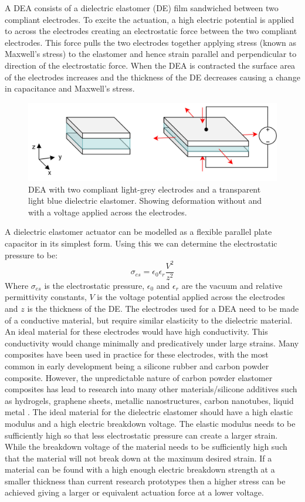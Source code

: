 A DEA consists of a dielectric elastomer (DE) film sandwiched between two compliant electrodes. To excite the actuation, a high electric potential is applied to across the electrodes creating an electrostatic force between the two compliant electrodes. This force pulls the two electrodes together applying stress (known as Maxwell's stress) to the elastomer and hence strain parallel and perpendicular to direction of the electrostatic force. When the DEA is contracted the surface area of the electrodes increases and the thickness of the DE decreases causing a change in capacitance and Maxwell's stress.
\begin{figure}[H]
	\centering
	\includegraphics[width=0.7\linewidth]{Figures/dea_square_2state.jpg}
	\caption{DEA with two compliant light-grey electrodes and a transparent light blue dielectric elastomer. Showing deformation without and with a voltage applied across the electrodes.}
	\label{fig:Artificial Muscle_DEA}
\end{figure}
A dielectric elastomer actuator can be modelled as a flexible parallel plate capacitor in its simplest form. Using this we can determine the electrostatic pressure to be:
\begin{equation}
	\sigma_{es} = \epsilon_0 \epsilon_r \frac{V^2}{z^2}
\end{equation}
Where $\sigma_{es}$ is the electrostatic pressure, $\epsilon_0$ and $\epsilon_r$ are the vacuum and relative permittivity constants, $V$ is the voltage potential applied across the electrodes and $z$ is the thickness of the DE. The electrodes used for a DEA need to be made of a conductive material, but require similar elasticity to the dielectric material. An ideal material for these electrodes would have high conductivity. This conductivity would change minimally and predicatively under large strains. Many composites have been used in practice for these electrodes, with the most common in early development being a silicone rubber and carbon powder composite. However, the unpredictable nature of carbon powder elastomer composites has lead to research into many other materials/silicone additives such as hydrogels, graphene sheets, metallic nanostructures, carbon nanotubes, liquid metal \citep{Liu2013,Rogers2013,Bele2018,Quinsaat2015}. The ideal material for the dielectric elastomer should have a high elastic modulus and a high electric breakdown voltage. The elastic modulus needs to be sufficiently high so that less electrostatic pressure can create a larger strain. While the breakdown voltage of the material needs to be sufficiently high such that the material will not break down at the maximum desired strain. If a material can be found with a high enough electric breakdown strength at a smaller thickness than current research prototypes then a higher stress can be achieved giving a larger or equivalent actuation force at a lower voltage.

